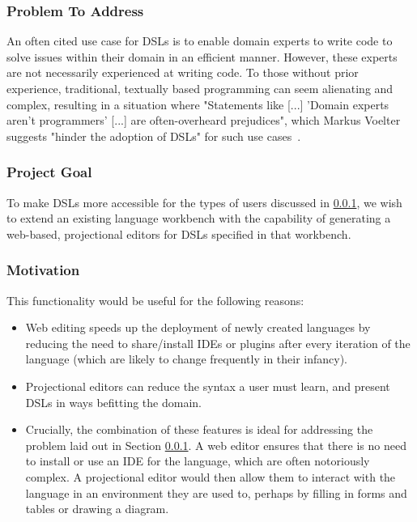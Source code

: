 \documentclass{article}
\begin{document}
\subsubsection{Problem To Address}\label{problem}

An often cited use case for DSLs is to enable domain experts to write code to solve issues within their domain in an efficient manner. However, these experts are not necessarily experienced at writing code. To those without prior experience, traditional, textually based programming can seem alienating and complex, resulting in a situation where "Statements like [...] 'Domain experts aren't programmers' [...] are often-overheard prejudices", which Markus Voelter suggests "hinder the adoption of DSLs" for such use cases~\cite[pg.45]{dslEngineering}.

\subsubsection{Project Goal}\label{goal}
To make DSLs more accessible for the types of users discussed in \ref{problem}, we wish to extend an existing language workbench with the capability of generating a web-based, projectional editors for DSLs specified in that workbench. 

\subsubsection{Motivation}\label{motivation}
This functionality would be useful for the following reasons:
\begin{itemize}
\item Web editing speeds up the deployment of newly created languages by reducing the need to share/install IDEs or plugins after every iteration of the language (which are likely to change frequently in their infancy). 
\item Projectional editors can reduce the syntax a user must learn, and present DSLs in ways befitting the domain.
\item Crucially, the combination of these features is ideal for addressing the problem laid out in Section \ref{problem}. A web editor ensures that there is no need to install or use an IDE for the language, which are often notoriously complex. A projectional editor would then allow them to interact with the language in an environment they are used to, perhaps by filling in forms and tables or drawing a diagram.  
\end{itemize} 
\end{document}
